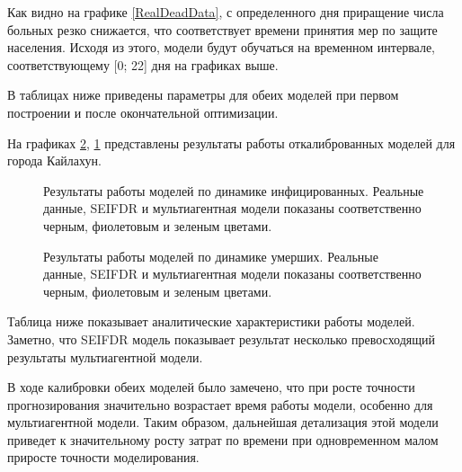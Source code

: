 Как видно на графике \ref{RealDeadData}, с определенного дня приращение числа больных резко снижается, что соответствует времени принятия мер по защите населения. Исходя из этого, модели будут обучаться на временном интервале, соответствующему  [0; 22] дня на графиках выше.

В таблицах ниже приведены параметры для обеих моделей при первом построении и после окончательной оптимизации.


На графиках \ref{FinishedModelDead}, \ref{RealInfectedDynamic}  представлены результаты работы откалиброванных моделей для города Кайлахун. 

\begin{figure}[H]
	\caption{Результаты работы моделей по динамике инфицированных. Реальные данные, SEIFDR и мультиагентная модели показаны соответственно черным, фиолетовым и зеленым цветами.} 
	\label{RealInfectedDynamic}
\end{figure}
\begin{figure}[H]
	\caption{Результаты работы моделей по динамике умерших. Реальные данные, SEIFDR и мультиагентная модели показаны соответственно черным, фиолетовым и зеленым цветами.}
	\label{FinishedModelDead}
\end{figure}


Таблица ниже показывает аналитические характеристики работы моделей. Заметно, что SEIFDR  модель показывает результат несколько превосходящий результаты мультиагентной модели.

В ходе калибровки обеих моделей было замечено, что при росте точности прогнозирования значительно возрастает время работы модели, особенно для мультиагентной модели. Таким образом, дальнейшая детализация этой модели приведет к значительному росту затрат по времени при одновременном малом приросте точности моделирования. 



